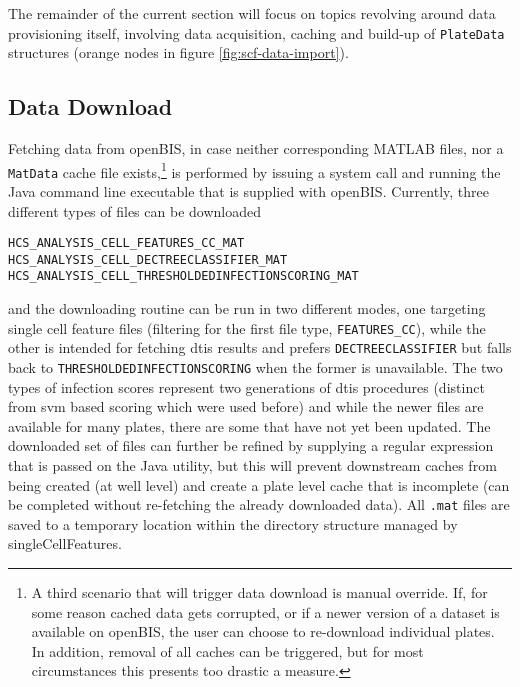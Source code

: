 The remainder of the current section will focus on topics revolving around data provisioning itself, involving data acquisition, caching and build-up of \texttt{PlateData} structures (orange nodes in figure \ref{fig:scf-data-import}).

\subsection{Data Download}
Fetching data from openBIS, in case neither corresponding MATLAB files, nor a \texttt{MatData} cache file exists,\footnote{A third scenario that will trigger data download is manual override. If, for some reason cached data gets corrupted, or if a newer version of a dataset is available on openBIS, the user can choose to re-download individual plates. In addition, removal of all caches can be triggered, but for most circumstances this presents too drastic a measure.} is performed by issuing a system call and running the Java command line executable that is supplied with openBIS. Currently, three different types of files can be downloaded

\begin{center}
\texttt{HCS_ANALYSIS_CELL_FEATURES_CC_MAT}
\texttt{HCS_ANALYSIS_CELL_DECTREECLASSIFIER_MAT}
\texttt{HCS_ANALYSIS_CELL_THRESHOLDEDINFECTIONSCORING_MAT}
\end{center}

and the downloading routine can be run in two different modes, one targeting single cell feature files (filtering for the first file type, \texttt{FEATURES_CC}), while the other is intended for fetching \gls{dtis} results and prefers \texttt{DECTREECLASSIFIER} but falls back to \texttt{THRESHOLDEDINFECTIONSCORING} when the former is unavailable. The two types of infection scores represent two generations of \gls{dtis} procedures (distinct from \gls{svm} based scoring which were used before) and while the newer files are available for many plates, there are some that have not yet been updated. The downloaded set of files can further be refined by supplying a regular expression that is passed on the Java utility, but this will prevent downstream caches from being created (at well level) and create a plate level cache that is incomplete (can be completed without re-fetching the already downloaded data). All \texttt{.mat} files are saved to a temporary location within the directory structure managed by singleCellFeatures.

